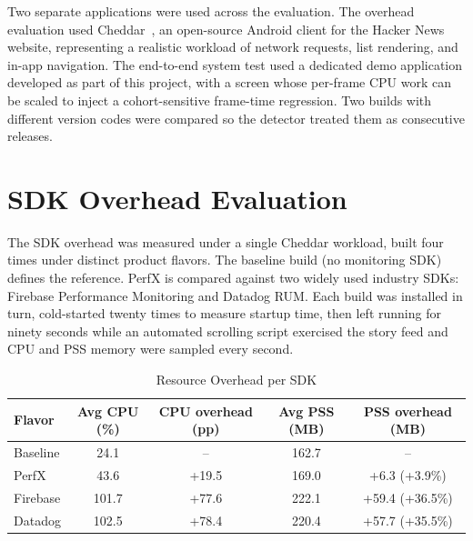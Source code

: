 Two separate applications were used across the evaluation. The overhead evaluation used Cheddar~\cite{cheddar}, an open-source Android client for the Hacker News website, representing a realistic workload of network requests, list rendering, and in-app navigation. The end-to-end system test used a dedicated demo application developed as part of this project, with a screen whose per-frame CPU work can be scaled to inject a cohort-sensitive frame-time regression. Two builds with different version codes were compared so the detector treated them as consecutive releases.

\section{SDK Overhead Evaluation}
\label{sec:eval_overhead}

The SDK overhead was measured under a single Cheddar workload, built four times under distinct product flavors. The baseline build (no monitoring SDK) defines the reference. PerfX is compared against two widely used industry SDKs: Firebase Performance Monitoring \cite{FirebasePerf} and Datadog RUM. Each build was installed in turn, cold-started twenty times to measure startup time, then left running for ninety seconds while an automated scrolling script exercised the story feed and CPU and PSS memory were sampled every second.

\begin{table}[htbp]
    \centering
    \small
    \caption{Resource Overhead per SDK}
    \label{tab:eval_overhead}
    \begin{tabular}{lcccc}
        \toprule
        Flavor   & Avg CPU (\%) & CPU overhead (pp) & Avg PSS (MB) & PSS overhead (MB) \\
        \midrule
        Baseline & 24.1         & --                & 162.7        & --                \\
        PerfX    & 43.6         & +19.5             & 169.0        & +6.3 (+3.9\%)     \\
        Firebase & 101.7        & +77.6             & 222.1        & +59.4 (+36.5\%)   \\
        Datadog  & 102.5        & +78.4             & 220.4        & +57.7 (+35.5\%)   \\
        \bottomrule
    \end{tabular}
\end{table}

